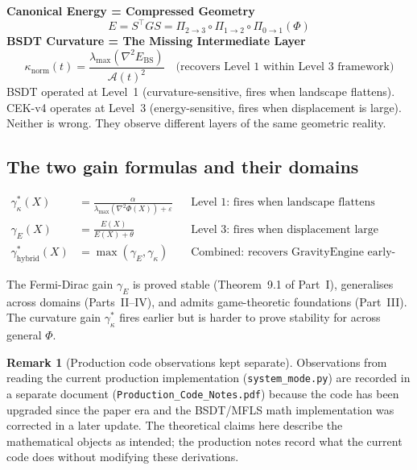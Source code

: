 \documentclass[11pt,a4paper]{article}
\theoremstyle{definition}
\newtheorem{remark}[theorem]{Remark}
\begin{document}
\begin{lockedbox}
\textbf{Canonical Energy = Compressed Geometry}
\[
E = S^\top GS = \Pi_{2\to3}\circ\Pi_{1\to2}\circ\Pi_{0\to1}(\Phi)
\]
\textbf{BSDT Curvature = The Missing Intermediate Layer}
\[
\kappa_\mathrm{norm}(t) = \frac{\lambda_\mathrm{max}(\nabla^2 E_\mathrm{BS})}{\mathcal{A}(t)^2}
\quad\text{(recovers Level~1 within Level~3 framework)}
\]
BSDT operated at Level~1 (curvature-sensitive, fires when landscape flattens).\\
CEK-v4 operates at Level~3 (energy-sensitive, fires when displacement is large).\\
Neither is wrong. They observe different layers of the same geometric reality.
\end{lockedbox}

\subsection{The two gain formulas and their domains}

\begin{align*}
\gamma^*_\kappa(X) &= \frac{\alpha}{\lambda_\mathrm{max}(\nabla^2\Phi(X))+\varepsilon}
&&\text{Level~1: fires when landscape flattens (earliest warning)}\\
\gamma_E(X) &= \frac{E(X)}{E(X)+\theta}
&&\text{Level~3: fires when displacement large (tractable control)}\\
\gamma^*_\mathrm{hybrid}(X) &= \max(\gamma_E, \gamma_\kappa)
&&\text{Combined: recovers GravityEngine early-warning advantage}
\end{align*}

The Fermi-Dirac gain $\gamma_E$ is proved stable (Theorem~9.1 of Part~I),
generalises across domains (Parts~II--IV), and admits game-theoretic foundations
(Part~III). The curvature gain $\gamma^*_\kappa$ fires earlier but is
harder to prove stability for across general $\Phi$.

\begin{remark}[Production code observations kept separate]
Observations from reading the current production implementation
(\texttt{system\_mode.py}) are recorded in a separate document
(\texttt{Production\_Code\_Notes.pdf}) because the code has been
upgraded since the paper era and the BSDT/MFLS math implementation
was corrected in a later update. The theoretical claims here describe
the mathematical objects as intended; the production notes record
what the current code does without modifying these derivations.
\end{remark}
\end{document}
